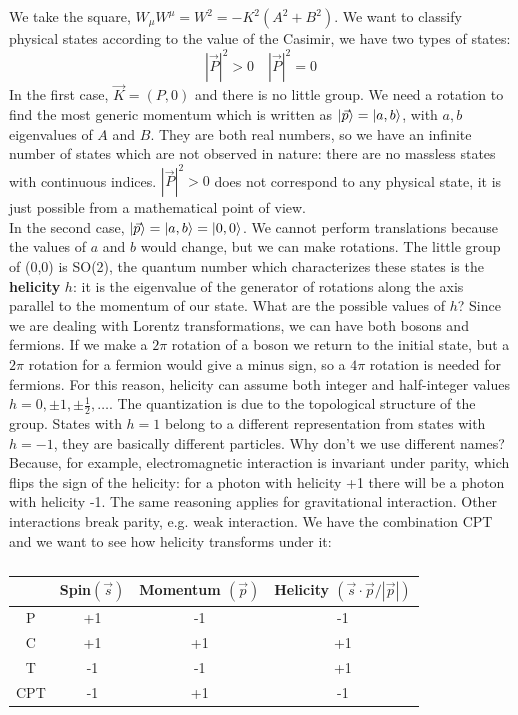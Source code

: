 \documentclass[../main.tex]{subfiles}
\begin{document}
We take the square, $W_\mu W^\mu=W^2=-K^2(A^2+B^2)$. We want to classify physical states according to the value of the Casimir, we have two types of states:
\[
|\vec{P}|^2>0 \quad |\vec{P}|^2=0
\]
In the first case, $\vec{K}=(P,0)$ and there is no little group. We need a rotation to find the most generic momentum which is written as $\ket{\vec{p}}=\ket{a,b}$, with $a,b$ eigenvalues of $A$ and $B$. They are both real numbers, so we have an infinite number of states which are not observed in nature: there are no massless states with continuous indices. $|\vec{P}|^2>0$ does not correspond to any physical state, it is just possible from a mathematical point of view.\\
In the second case, $\ket{\vec{p}}=\ket{a,b}=\ket{0,0}$. We cannot perform translations because the values of $a$ and $b$ would change, but we can make rotations. The little group of (0,0) is SO(2), the quantum number which characterizes these states is the \textbf{helicity} $h$: it is the eigenvalue of the generator of rotations along the axis parallel to the momentum of our state. What are the possible values of $h$? Since we are dealing with Lorentz transformations, we can have both bosons and fermions. If we make a $2\pi$ rotation of a boson we return to the initial state, but a $2\pi$ rotation for a fermion would give a minus sign, so a $4\pi$ rotation is needed for fermions. For this reason, helicity can assume both integer and half-integer values $h=0,\pm1,\pm\frac{1}{2},\dots$. The quantization is due to the topological structure of the group. States with $h=1$ belong to a different representation from states with $h=-1$, they are basically different particles. Why don't we use different names? Because, for example, electromagnetic interaction is invariant under parity, which flips the sign of the helicity: for a photon with helicity +1 there will be a photon with helicity -1. The same reasoning applies for gravitational interaction. Other interactions break parity, e.g. weak interaction. We have the combination CPT and we want to see how helicity transforms under it:
\begin{table}[h]
    \centering
    \begin{tabular}{c|ccc}
     & Spin$(\vec{s})$ & Momentum $(\vec{p})$ & Helicity $(\vec{s}\cdot\vec{p}/|\vec{p}|)$ \\
     \hline
     P & +1 & -1 & -1 \\
     C & +1 & +1 & +1 \\
     T & -1 & -1 & +1 \\
     CPT & -1 & +1 & -1 \\
     \hline
    \end{tabular}
    \caption*{}
    \label{tab:my_label}
\end{table}\\
\end{document}
